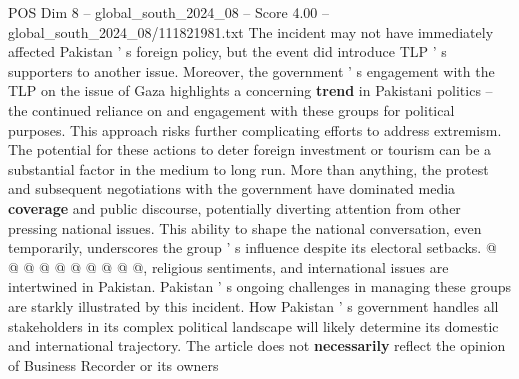 \begin{textsample}{POS Dim 8 – global\_south\_2024\_08 – Score 4.00 – global\_south\_2024\_08/111821981.txt}
The incident may not have immediately affected Pakistan ' s foreign policy, but the event did introduce TLP ' s supporters to another issue.
Moreover, the government ' s engagement with the TLP on the issue of Gaza highlights a concerning \textbf{trend} in Pakistani politics -- the continued reliance on and engagement with these groups for political purposes.
This approach risks further complicating efforts to address extremism.
The potential for these actions to deter foreign investment or tourism can be a substantial factor in the medium to long run.
More than anything, the protest and subsequent negotiations with the government have dominated media \textbf{coverage} and public discourse, potentially diverting attention from other pressing national issues.
This ability to shape the national conversation, even temporarily, underscores the group ' s influence despite its electoral setbacks. @ @ @ @ @ @ @ @ @ @, religious sentiments, and international issues are intertwined in Pakistan.
Pakistan ' s ongoing challenges in managing these groups are starkly illustrated by this incident.
How Pakistan ' s government handles all stakeholders in its complex political landscape will likely determine its domestic and international trajectory.
The article does not \textbf{necessarily} reflect the opinion of Business Recorder or its owners

\end{textsample}
